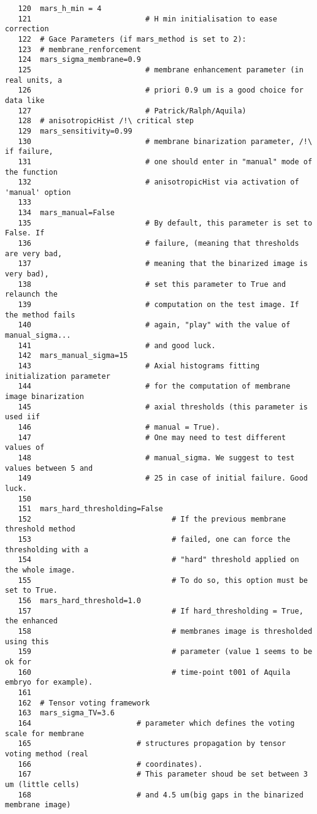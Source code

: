 \begin{verbatim}
   120	mars_h_min = 4     		
   121	                        # H min initialisation to ease correction
   122	# Gace Parameters (if mars_method is set to 2):
   123	# membrane_renforcement
   124	mars_sigma_membrane=0.9 
   125	                        # membrane enhancement parameter (in real units, a 
   126							# priori 0.9 um is a good choice for data like 
   127							# Patrick/Ralph/Aquila)
   128	# anisotropicHist /!\ critical step
   129	mars_sensitivity=0.99   
   130	                        # membrane binarization parameter, /!\ if failure,
   131							# one should enter in "manual" mode of the function
   132							# anisotropicHist via activation of 'manual' option
   133	
   134	mars_manual=False     	
   135	                        # By default, this parameter is set to False. If 
   136							# failure, (meaning that thresholds are very bad, 
   137							# meaning that the binarized image is very bad),
   138					 		# set this parameter to True and relaunch the 
   139					 		# computation on the test image. If the method fails
   140					 		# again, "play" with the value of manual_sigma... 
   141					 		# and good luck.
   142	mars_manual_sigma=15    
   143	                        # Axial histograms fitting initialization parameter 
   144							# for the computation of membrane image binarization
   145							# axial thresholds (this parameter is used iif 
   146							# manual = True).
   147							# One may need to test different values of 
   148							# manual_sigma. We suggest to test values between 5 and
   149							# 25 in case of initial failure. Good luck.
   150	
   151	mars_hard_thresholding=False  
   152	                              # If the previous membrane threshold method 
   153								  # failed, one can force the thresholding with a
   154								  # "hard" threshold applied on the whole image. 
   155								  # To do so, this option must be set to True.
   156	mars_hard_threshold=1.0       
   157	                              # If hard_thresholding = True, the enhanced 
   158								  # membranes image is thresholded using this 
   159								  # parameter (value 1 seems to be ok for 
   160								  # time-point t001 of Aquila embryo for example).
   161	
   162	# Tensor voting framework
   163	mars_sigma_TV=3.6     
   164	                      # parameter which defines the voting scale for membrane
   165						  # structures propagation by tensor voting method (real
   166						  # coordinates). 
   167					 	  # This parameter shoud be set between 3 um (little cells)
   168					 	  # and 4.5 um(big gaps in the binarized membrane image)

\end{verbatim}
